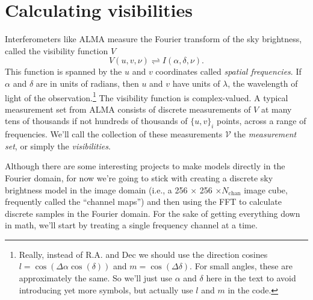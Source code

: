 \documentclass[modern]{aastex62}
\newcommand{\vd}{\boldsymbol{\mathcal{V}}} %
\begin{document}
\section{Calculating visibilities}
Interferometers like ALMA measure the Fourier transform of the sky brightness, called the visibility function $V$
\begin{equation}
  V(u, v, \nu) \rightleftharpoons I(\alpha, \delta, \nu).
\end{equation}
This function is spanned by the $u$ and $v$ coordinates called \emph{spatial frequencies}. If $\alpha$ and $\delta$ are in units of radians, then $u$ and $v$ have units of $\lambda$, the wavelength of light of the observation.\footnote{Really, instead of R.A. and Dec we should use the direction cosines $l = \cos(\Delta \alpha \cos(\delta))$ and $m = \cos(\Delta \delta)$. For small angles, these are approximately the same. So we'll just use $\alpha$ and $\delta$ here in the text to avoid introducing yet more symbols, but actually use $l$ and $m$ in the code.} The visibility function is complex-valued. A typical measurement set from ALMA consists of discrete measurements of $V$ at many tens of thousands if not hundreds of thousands of $\{ u, v\}_i$ points, across a range of frequencies. We'll call the collection of these measurements $\vd$ the \emph{measurement set}, or simply the \emph{visibilities}.

Although there are some interesting projects to make models directly in the Fourier domain, for now we're going to stick with creating a discrete sky brightness model in the image domain (i.e., a 256 $\times$ 256 $\times N_\mathrm{chan}$ image cube, frequently called the ``channel maps'') and then using the FFT to calculate discrete samples in the Fourier domain. For the sake of getting everything down in math, we'll start by treating a single frequency channel at a time. 
\end{document}

